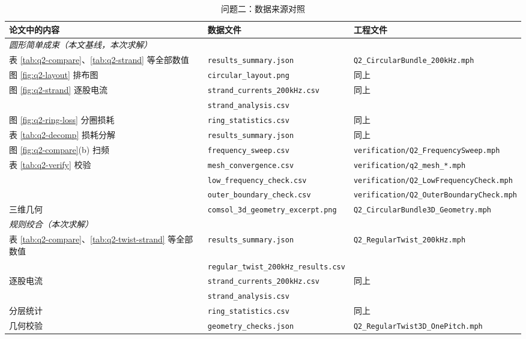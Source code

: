 \documentclass[12pt, a4paper]{ctexart}
\begin{document}
\begin{table}[H]
\centering
\caption{问题二：数据来源对照}
\label{tab:appendix-q2}
\small
\begin{adjustbox}{max width=\textwidth}
\begin{tabular}{l l l}
\toprule
\textbf{论文中的内容} & \textbf{数据文件} & \textbf{工程文件} \\
\midrule
\multicolumn{3}{l}{\textit{圆形简单成束（本文基线，本次求解）}} \\
表 \ref{tab:q2-compare}、\ref{tab:q2-strand} 等全部数值 & \texttt{results\_summary.json} & \texttt{Q2\_CircularBundle\_200kHz.mph} \\
图 \ref{fig:q2-layout} 排布图 & \texttt{circular\_layout.png} & 同上 \\
图 \ref{fig:q2-strand} 逐股电流 & \texttt{strand\_currents\_200kHz.csv} & 同上 \\
 & \texttt{strand\_analysis.csv} & \\
图 \ref{fig:q2-ring-loss} 分圈损耗 & \texttt{ring\_statistics.csv} & 同上 \\
表 \ref{tab:q2-decomp} 损耗分解 & \texttt{results\_summary.json} & 同上 \\
图 \ref{fig:q2-compare}(b) 扫频 & \texttt{frequency\_sweep.csv} & \texttt{verification/Q2\_FrequencySweep.mph} \\
表 \ref{tab:q2-verify} 校验 & \texttt{mesh\_convergence.csv} & \texttt{verification/q2\_mesh\_*.mph} \\
 & \texttt{low\_frequency\_check.csv} & \texttt{verification/Q2\_LowFrequencyCheck.mph} \\
 & \texttt{outer\_boundary\_check.csv} & \texttt{verification/Q2\_OuterBoundaryCheck.mph} \\
三维几何 & \texttt{comsol\_3d\_geometry\_excerpt.png} & \texttt{Q2\_CircularBundle3D\_Geometry.mph} \\
\midrule
\multicolumn{3}{l}{\textit{规则绞合（本次求解）}} \\
表 \ref{tab:q2-compare}、\ref{tab:q2-twist-strand} 等全部数值 & \texttt{results\_summary.json} & \texttt{Q2\_RegularTwist\_200kHz.mph} \\
 & \texttt{regular\_twist\_200kHz\_results.csv} & \\
逐股电流 & \texttt{strand\_currents\_200kHz.csv} & 同上 \\
 & \texttt{strand\_analysis.csv} & \\
分层统计 & \texttt{ring\_statistics.csv} & 同上 \\
几何校验 & \texttt{geometry\_checks.json} & \texttt{Q2\_RegularTwist3D\_OnePitch.mph} \\

\end{tabular}
\end{adjustbox}
\end{table}
\end{document}
